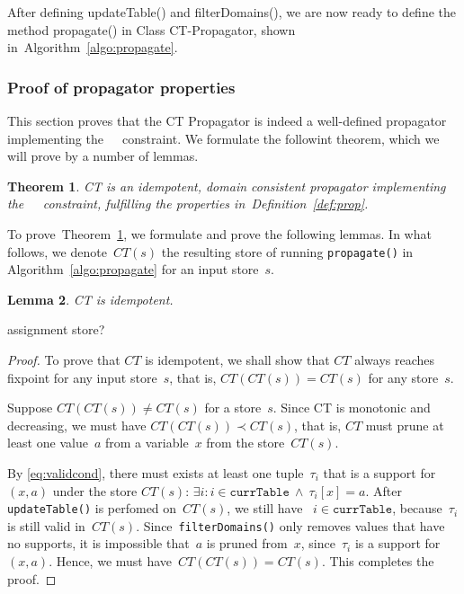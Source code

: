 \documentclass[a4paper,11pt]{article}
\newtheorem{proof}{Proof}
\newtheorem{theorem}{Theorem}[section]
\newtheorem{lemma}[theorem]{Lemma}
\newcommand{\T}[1]{\texttt{#1}}
\newcommand{\Todo}[1]{{\color{blue}#1}}
\newcommand{\Algoref}[1]{Algorithm~\ref{#1}}
\newcommand{\Table}{\Constraint{Table}~}
\newcommand{\Defref}[1]{Definition~\ref{#1}}
\newcommand{\Thmref}[1]{Theorem~\ref{#1}}
\newcommand{\Eqref}[1]{\eqref{#1}}
\newcommand{\CurrTable}{\texttt{currTable}}
\numberwithin{equation}{section}
\begin{document}
After defining updateTable() and filterDomains(), we are now ready to
define the method propagate() in Class CT-Propagator, shown 
in~\Algoref{algo:propagate}.

\begin{algorithm}[H]
  \begin{algorithmic}[1]  %
    
  \end{algorithmic}
  \caption{Method propagate() in Class CT-Propagator. updateTable()
    (\Algoref{algo:updateTable}) is
  called, and if the current table is empty, we are in a failed node.
  Otherwise, filterDomains() (\Algoref{algo:filterDomains})
  is called, and the return value of that method is returned.}
  \label{algo:propagate}
\end{algorithm}

\subsubsection{Proof of propagator properties}
This section proves that the CT Propagator is indeed a well-defined propagator
implementing the~\Table~constraint. We formulate the followint theorem, which
we will prove by a number of lemmas.

\begin{theorem} \label{thm:prop}
  CT is an idempotent, domain consistent propagator implementing 
  the~\Table~constraint, fulfilling the properties in~\Defref{def:prop}.
\end{theorem}

To prove~\Thmref{thm:prop}, we formulate and prove the following lemmas.
In what follows, we denote~$CT(s)$ the resulting store of running 
\texttt{propagate()} in \Algoref{algo:propagate} for an input store~$s$.

\begin{lemma}
  CT is idempotent.
\end{lemma}

\Todo{assignment store?}

\begin{proof}
  To prove that $CT$ is idempotent, we shall show that $CT$ always reaches
  fixpoint for any input store~$s$, that is, $CT(CT(s)) = CT(s)$ for any
  store~$s$.

  Suppose $CT(CT(s)) \neq CT(s)$ for a store~$s$. 
  Since CT is monotonic
  and decreasing, we must have $CT(CT(s)) \prec CT(s)$, that is, $CT$
  must prune at least one value~$a$ from a variable~$x$ from the 
  store~$CT(s)$. 

  By \Eqref{eq:validcond}, there must exists at least one 
  tuple~$\tau_i$
  that is a support for~$(x,a)$ under the store $CT(s)$: 
  $\exists i: i \in \CurrTable \ \land \ \tau_i[x] = a$.
  After \T{updateTable()} is perfomed on~$CT(s)$, we still have
  ~$i \in \CurrTable$, because~$\tau_i$ is still valid in~$CT(s)$.
  Since~\T{filterDomains()} only removes values that have no supports,
  it is impossible that~$a$ is pruned from~$x$, since~$\tau_i$ is a
  support for~$(x,a)$. Hence, we must have~$CT(CT(s)) = CT(s)$.
  This completes the proof.
\end{proof}
\end{document}
